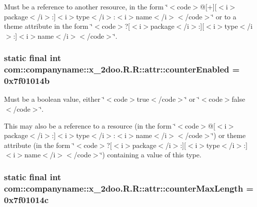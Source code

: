 Must be a reference to another resource, in the form \char`\"{}$<$code$>$@\mbox{[}+\mbox{]}\mbox{[}$<$i$>$package$<$/i$>$:\mbox{]}$<$i$>$type$<$/i$>$:$<$i$>$name$<$/i$>$$<$/code$>$\char`\"{} or to a theme attribute in the form \char`\"{}$<$code$>$?\mbox{[}$<$i$>$package$<$/i$>$:\mbox{]}\mbox{[}$<$i$>$type$<$/i$>$:\mbox{]}$<$i$>$name$<$/i$>$$<$/code$>$\char`\"{}. \hypertarget{classcom_1_1companyname_1_1x__2doo_1_1_r_1_1attr_0c9634c4017ec24e3f9b9027c162ee16}{
\subsubsection[{counterEnabled}]{\setlength{\rightskip}{0pt plus 5cm}static final int com::companyname::x\_\-2doo.R.R::attr::counterEnabled = 0x7f01014b}}
\label{classcom_1_1companyname_1_1x__2doo_1_1_r_1_1attr_0c9634c4017ec24e3f9b9027c162ee16}


Must be a boolean value, either \char`\"{}$<$code$>$true$<$/code$>$\char`\"{} or \char`\"{}$<$code$>$false$<$/code$>$\char`\"{}. 

This may also be a reference to a resource (in the form \char`\"{}$<$code$>$@\mbox{[}$<$i$>$package$<$/i$>$:\mbox{]}$<$i$>$type$<$/i$>$:$<$i$>$name$<$/i$>$$<$/code$>$\char`\"{}) or theme attribute (in the form \char`\"{}$<$code$>$?\mbox{[}$<$i$>$package$<$/i$>$:\mbox{]}\mbox{[}$<$i$>$type$<$/i$>$:\mbox{]}$<$i$>$name$<$/i$>$$<$/code$>$\char`\"{}) containing a value of this type. \hypertarget{classcom_1_1companyname_1_1x__2doo_1_1_r_1_1attr_5c358a3029952d0802399d06ba3931d7}{
\subsubsection[{counterMaxLength}]{\setlength{\rightskip}{0pt plus 5cm}static final int com::companyname::x\_\-2doo.R.R::attr::counterMaxLength = 0x7f01014c}}
\label{classcom_1_1companyname_1_1x__2doo_1_1_r_1_1attr_5c358a3029952d0802399d06ba3931d7}


